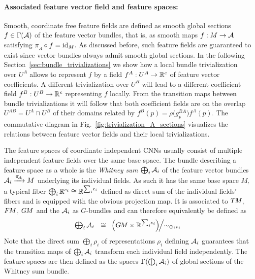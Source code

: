 \paragraph{Associated feature vector field and feature spaces:}
Smooth, coordinate free feature fields are defined as smooth global sections $f\in\Gamma(\mathcal{A})$ of the feature vector bundles, that is, as smooth maps $f:M\to\mathcal{A}$ satisfying $\piA\circ f=\id_M$.
As discussed before, such feature fields are guaranteed to exist since vector bundles always admit smooth global sections.
In the following Section~\ref{sec:bundle_trivializations} we show how a local bundle trivialization over $U^A$ allows to represent $f$ by a field $f^A:U^A\to\mathbb{R}^c$ of feature vector coefficients.
A different trivialization over $U^B$ will lead to a different coefficient field $f^B:U^B\to\mathbb{R}^c$ representing $f$ locally.
From the transition maps between bundle trivializations it will follow that both coefficient fields are on the overlap $U^{AB}=U^A\cap U^B$ of their domains related by $f^B(p)=\rho\big(g_p^{BA}\big) f^A(p)$.
The commutative diagram in Fig.~\ref{fig:trivialization_A_sections} visualizes the relations between feature vector fields and their local trivializations.


The feature spaces of coordinate independent CNNs usually consist of multiple independent feature fields over the same base space.
The bundle describing a feature space as a whole is the \emph{Whitney sum} $\bigoplus_i\mathcal{A}_i$ of the feature vector bundles $\A_i\xrightarrow{\scalebox{.85}{$\pi_{\scalebox{.6}{$\!\A_i$}}$}}M$ underlying its individual fields.
As such it has the same base space $M$, a typical fiber $\bigoplus_i\mathbb{R}^{c_i} \cong \mathbb{R}^{\sum_i\!c_i}$ defined as direct sum of the individual fields' fibers and is equipped with the obvious projection map.
It is associated to $T\mkern-1.5muM$, $F\mkern-1.5muM$, $G\mkern-1.4muM$ and the $\mathcal{A}_i$ as $G$-bundles and can therefore equivalently be defined as
\begin{align}
    \scalebox{1.1}{$\bigoplus$}_i\,\A_i\ \ \cong\,\ \left(\GM\times\R^{\sum_i\!c_i}\right)\!\!\Big/\!\!\sim_{\oplus_i\rho_i}
\end{align}
Note that the direct sum $\bigoplus_i\rho_i$ of representations $\rho_i$ defining $\mathcal{A}_i$ guarantees that the transition maps of $\bigoplus_i\mathcal{A}_i$ transform each individual field independently.
The feature spaces are then defined as the spaces $\Gamma\!\left(\bigoplus_i\mathcal{A}_i\right)$ of global sections of the Whitney sum bundle.
